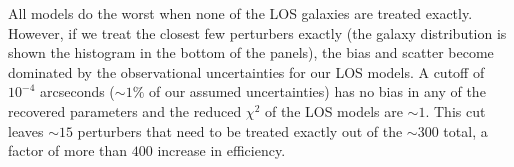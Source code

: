 All models do the worst when none of the LOS galaxies are treated exactly. However, if we treat the closest few perturbers exactly (the galaxy distribution is shown the histogram in the bottom of the panels), the bias and scatter become dominated by the observational uncertainties for our LOS models. A cutoff of $10^{-4}$ arcseconds ($\sim1\%$ of our assumed uncertainties) has no bias in any of the recovered parameters and the reduced $\chi^2$ of the LOS models are $\sim 1$. This cut leaves $\sim 15$ perturbers that need to be treated exactly out of the $\sim 300$ total, a factor of more than $400$ increase in efficiency.
  
  
  